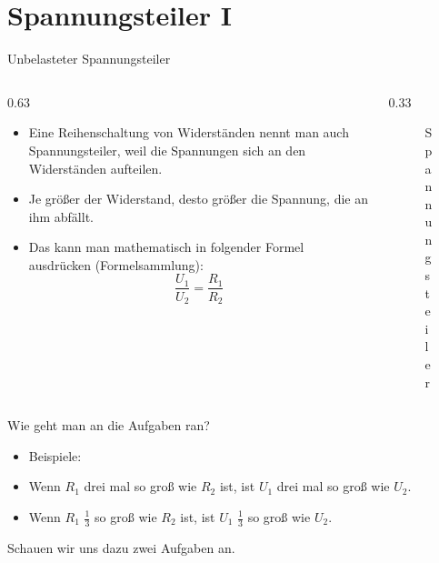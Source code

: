 
\section{Spannungsteiler I}
\label{section:spannungsteiler_1}
\begin{frame}{Unbelasteter Spannungsteiler}

\begin{columns}
    \begin{column}{0.63\textwidth}
    \begin{itemize}
  \item Eine Reihenschaltung von Widerständen nennt man auch Spannungsteiler, weil die Spannungen sich an den Widerständen aufteilen.
  \item Je größer der Widerstand, desto größer die Spannung, die an ihm abfällt.
  \item Das kann man mathematisch in folgender Formel ausdrücken (Formelsammlung):
    $$\dfrac{ U_{ 1 } }{ U_{ 2 } } = \dfrac{ R_{ 1 } }{ R_{ 2 } }$$
  \end{itemize}

    \end{column}
   \begin{column}{0.33\textwidth}
       
\begin{figure}
    \caption{\scriptsize Spannungsteiler}
    \label{e_spannungsteiler}
\end{figure}


   \end{column}
\end{columns}

\end{frame}


\begin{frame}Wie geht man an die Aufgaben ran?

\begin{itemize}
  \item Beispiele:
  \item Wenn $R_{ 1 }$ drei mal so groß wie $R_{ 2 }$ ist, ist $U_{ 1 }$ drei mal so groß wie $U_{ 2 }$.
  \item Wenn $R_{ 1 }$ $\frac{ 1 }{ 3 }$ so groß wie $R_{ 2 }$ ist, ist $U_{ 1 }$ $\frac{ 1 }{ 3 }$ so groß wie $U_{ 2 }$.
  \end{itemize}
Schauen wir uns dazu zwei Aufgaben an.

\end{frame}

